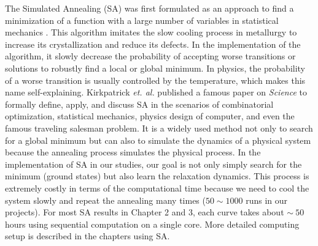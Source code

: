 The Simulated Annealing (SA) \cite{SA} was first formulated as an approach to find a minimization of a function with a large number of variables in statistical mechanics \cite{khachaturyan1979statistical, khachaturyan1981thermodynamic}. This algorithm imitates the slow cooling process in metallurgy to increase its crystallization and reduce its defects. In the implementation of the algorithm, it slowly decrease the probability of accepting worse transitions or solutions to robustly find a local or global minimum. In physics, the probability of a worse transition is usually controlled by the temperature, which makes this name self-explaining. Kirkpatrick {\it et. al.} \cite{SA} published a famous paper on {\it Science} to formally define, apply, and discuss SA  in the scenarios of combinatorial optimization, statistical mechanics, physics design of computer, and even the famous traveling salesman problem. It is a widely used method not only to search for a global minimum but can also to simulate the dynamics of a physical system because the annealing process simulates the physical process.
In the implementation of SA in our studies, our goal is not only simply search for the minimum (ground states) but also learn the relaxation dynamics. This process is extremely costly in terms of the computational time because we need to cool the system slowly and repeat the annealing many times ($50\sim 1000$ runs in our projects). For most SA results in Chapter 2 and 3, each curve takes about $\sim ~50$ hours using sequential computation on a single core. More detailed computing setup is described in the chapters using SA.


